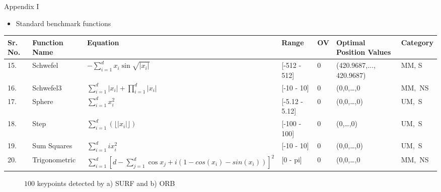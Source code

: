 \documentclass [9pt,times] {beamer}
\begin{document}
\begin{frame}[fragile]{Appendix I}
\begin{itemize}
\item Standard benchmark functions
\end{itemize}
\begin{table}
\scriptsize
\renewcommand{\arraystretch}{1}
\vspace{-0.25cm}
  \begin{tabular}{p{0.08in} p{0.32in} p{1.5in} p{0.4in} p{0.08in} p{0.34in} p{0.34in}}
    \hline
\textbf{Sr. No.}  &\textbf{Function Name}	&	 \textbf{Equation}	&			\textbf{Range }	 & \textbf{OV} &\textbf{Optimal Position Values }&\textbf{Category}\\
\hline
15.	&	Schwefel	&	$ 	- \sum_{i=1}^d x_i \sin\sqrt{|x_i|} $ &	[-512 - 512]	&	0	 &		 (420.9687,..., 420.9687)& MM, S\\
16.	&	Schwefel3	&	$ \sum_{i=1}^d |x_i| + \prod_{i=1}^d |x_i| $	&	[-10 - 10] 	&	 0	&	 (0,0,\dots,0& MM,\ NS \\
17.	&	Sphere	&	$ \sum_{i=1}^{d} x_i^2 $ &	[-5.12 - 5.12]	&	0	&(0,0,\dots,0)	& UM,\ S\\
18. &	Step	&	$\sum_{i=1}^{d} (\lfloor |x_i|\rfloor) $	&	[-100 - 100]	&	 0	&	 (0,\dots,0)& UM,\ S\\
19.	&	Sum Squares	&	$  \sum_{i=1}^{d}ix_i^2$	&	[-10 - 10] 	&	0 &	(0,0,\dots,0)	& UM,\ S\\
20.	&	Trigonometric	&	$ 	 \sum_{i=1}^{d} [d - \sum_{j=1}^d \cos x_j + i (1 - cos(x_i) - sin(x_i))]^2 $ &	[0 - pi]	&	 0	&	 (0,0,\dots,0& MM,\ NS \\

\end{tabular}
\end{table}


\begin{figure}[t]
			\centering
			\caption{{\scriptsize $100$ keypoints detected by a) SURF and b) ORB }}\label{fig:emp}
\end{figure}
\end{frame}
\end{document}
